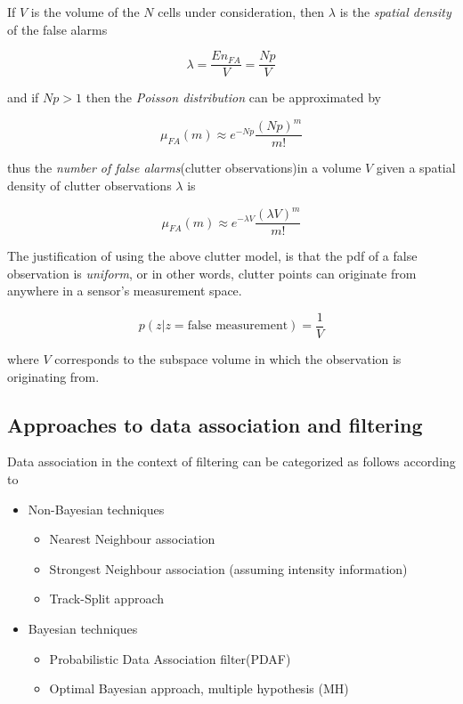 If $V$ is the volume of the $N$ cells under consideration, then $\lambda$ is the \emph{spatial density }of the false alarms


$$
\lambda = \frac{E{n_{FA}}}{V} = \frac{Np}{V}
$$


and if $Np >1$ then the \emph{Poisson distribution} can be approximated by 

\begin{equation}\label{eq:poisson}
\mu_{FA}(m) \approx e^{-Np}\frac{(Np)^m}{m!}
\end{equation}


thus the \emph{number of false alarms}(clutter observations)in a volume $V$ given a spatial density of clutter observations $\lambda$ is

$$
\mu_{FA}(m) \approx e^{-\lambda V}\frac{(\lambda V)^m}{m!}
$$

The justification of using the above clutter model, is that the pdf of a false observation  is \emph{uniform}, or in other words, clutter points can originate from anywhere in a sensor's measurement space.


$$
p(z|{z = \text{false measurement}}) = \frac{1}{V}
$$


where $V$ corresponds to the subspace volume in which the observation is originating from.

\subsection{Approaches to data association and filtering}

Data association in the context of filtering can be categorized as follows according to \cite{Shalom1995}

\begin{itemize}
	\item Non-Bayesian techniques
	\begin{itemize}
		\item Nearest Neighbour association
		\item Strongest Neighbour association (assuming intensity information)
		\item Track-Split approach
	\end{itemize}
	
	\item Bayesian techniques
	\begin{itemize}
		\item Probabilistic Data Association filter(PDAF)
		\item Optimal Bayesian approach, multiple hypothesis (MH)
	\end{itemize}

\end{itemize}
